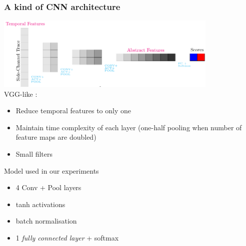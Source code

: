 \begin{frame}
\frametitle{A kind of CNN architecture}
\vspace*{-10pt}
\includegraphics[width=0.8\textwidth]{../tikz_per_manuscritto/convnet_arch.pdf} \\VGG-like \cite{simonyan2014very}:
\begin{itemize}
\item Reduce temporal features to only one
\item Maintain time complexity of each layer (one-half pooling when number of feature maps are doubled)
\item Small filters
\end{itemize}
\begin{block}{Model used in our experiments}
\begin{itemize}
\item 4 Conv + Pool layers
\item tanh activations
\item batch normalisation \cite{batch_norm}
\item 1 \emph{fully connected layer} + softmax
\end{itemize}
\end{block}

\end{frame}

